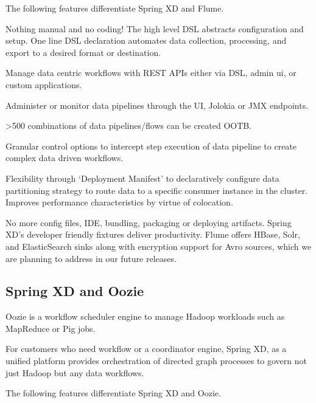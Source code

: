 The following features differentiate Spring XD and Flume.

\begin{itemize*}
\item Nothing manual and no coding! The high level DSL abstracts configuration and setup. One line DSL declaration automates data collection, processing, and export to a desired format or destination.
\item Manage data centric workflows with REST APIs either via DSL, admin ui, or custom applications.
\item Administer or monitor data pipelines through the UI, Jolokia or JMX endpoints. 
\item >500 combinations of data pipelines/flows can be created OOTB.
\item Granular control options to intercept step execution of data pipeline to create complex data driven workflows.
\item Flexibility through `Deployment Manifest' to declaratively configure data partitioning strategy to route data to a specific consumer instance in the cluster. Improves performance characteristics by virtue of colocation.
\end{itemize*}

No more config files, IDE, bundling, packaging or deploying artifacts. Spring XD's developer friendly fixtures deliver productivity. Flume offers HBase, Solr, and ElasticSearch sinks along with encryption support for Avro sources, which we are planning to address in our future releases.

\subsection{Spring XD and Oozie}
Oozie is a workflow scheduler engine to manage Hadoop workloads such as MapReduce or Pig jobs. 

For customers who need workflow or a coordinator engine, Spring XD, as a unified platform provides orchestration of directed graph processes to govern not just Hadoop but any data workflows. 

The following features differentiate Spring XD and Oozie.

